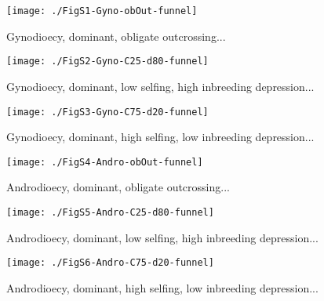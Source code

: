 \documentclass{article}
\begin{document}
\begin{figure}[ht!]
\centering
\texttt{[image: ./FigS1-Gyno-obOut-funnel]}
\caption{Gynodioecy, dominant, obligate outcrossing... }
\label{fig:GynObOutFunnel}
\end{figure}
\newpage{}

\begin{figure}[ht!]
\centering
\texttt{[image: ./FigS2-Gyno-C25-d80-funnel]}
\caption{Gynodioecy, dominant, low selfing, high inbreeding depression...}
\label{fig:GynC25d80Funnel}
\end{figure}
\newpage{}

\begin{figure}[ht!]
\centering
\texttt{[image: ./FigS3-Gyno-C75-d20-funnel]}
\caption{Gynodioecy, dominant, high selfing, low inbreeding depression...}
\label{fig:GynC75d20Funnel}
\end{figure}
\newpage{}

\begin{figure}[ht!]
\centering
\texttt{[image: ./FigS4-Andro-obOut-funnel]}
\caption{Androdioecy, dominant, obligate outcrossing... }
\label{fig:AndroObOutFunnel}
\end{figure}
\newpage{}

\begin{figure}[ht!]
\centering
\texttt{[image: ./FigS5-Andro-C25-d80-funnel]}
\caption{Androdioecy, dominant, low selfing, high inbreeding depression...}
\label{fig:AndC25d80Funnel}
\end{figure}
\newpage{}

\begin{figure}[ht!]
\centering
\texttt{[image: ./FigS6-Andro-C75-d20-funnel]}
\caption{Androdioecy, dominant, high selfing, low inbreeding depression...}
\label{fig:AndC75d20Funnel}
\end{figure}
\newpage{}


%
\end{document}
